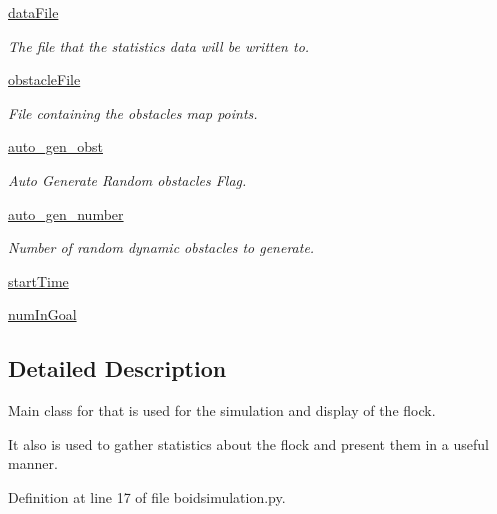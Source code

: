 \begin{DoxyCompactItemize}
\hyperlink{classboidsimulation_1_1FlockSim_a96885e067ac2333f807eaa9580a2ece4}{data\-File}
\begin{DoxyCompactList}\small\item\em The file that the statistics data will be written to. \end{DoxyCompactList}\item 
\hyperlink{classboidsimulation_1_1FlockSim_afddb603ed211f698d97b7265bcad0cef}{obstacle\-File}
\begin{DoxyCompactList}\small\item\em File containing the obstacles map points. \end{DoxyCompactList}\item 
\hyperlink{classboidsimulation_1_1FlockSim_a5e1ed98764e3cd800edaa7a904eacd15}{auto\-\_\-gen\-\_\-obst}
\begin{DoxyCompactList}\small\item\em Auto Generate Random obstacles Flag. \end{DoxyCompactList}\item 
\hyperlink{classboidsimulation_1_1FlockSim_a5e3ffa324294845eae535cb615e86856}{auto\-\_\-gen\-\_\-number}
\begin{DoxyCompactList}\small\item\em Number of random dynamic obstacles to generate. \end{DoxyCompactList}\item 
\hyperlink{classboidsimulation_1_1FlockSim_aea78473e0e592e48b6047f49f8254cc1}{start\-Time}
\item 
\hyperlink{classboidsimulation_1_1FlockSim_ae60982002b6c8c922b3822dbdec4bd41}{num\-In\-Goal}
\end{DoxyCompactItemize}


\subsection{Detailed Description}
Main class for that is used for the simulation and display of the flock. 

It also is used to gather statistics about the flock and present them in a useful manner. 

Definition at line 17 of file boidsimulation.\-py.




